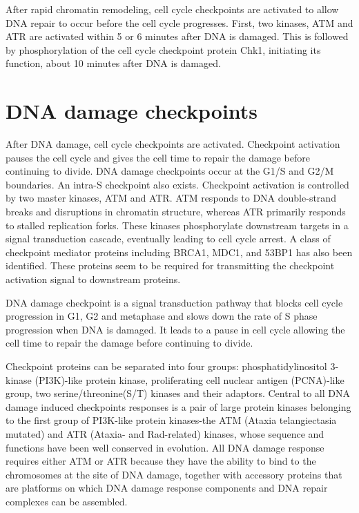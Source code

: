 After rapid chromatin remodeling, cell cycle checkpoints are activated to allow DNA repair to occur before the cell cycle progresses. First, two kinases, ATM and ATR are activated within 5 or 6 minutes after DNA is damaged. This is followed by phosphorylation of the cell cycle checkpoint protein Chk1, initiating its function, about 10 minutes after DNA is damaged.

\hypertarget{dna-damage-checkpoints}{%
\section{DNA damage checkpoints}\label{dna-damage-checkpoints}}

After DNA damage, cell cycle checkpoints are activated. Checkpoint activation pauses the cell cycle and gives the cell time to repair the damage before continuing to divide. DNA damage checkpoints occur at the G1/S and G2/M boundaries. An intra-S checkpoint also exists. Checkpoint activation is controlled by two master kinases, ATM and ATR. ATM responds to DNA double-strand breaks and disruptions in chromatin structure, whereas ATR primarily responds to stalled replication forks. These kinases phosphorylate downstream targets in a signal transduction cascade, eventually leading to cell cycle arrest. A class of checkpoint mediator proteins including BRCA1, MDC1, and 53BP1 has also been identified. These proteins seem to be required for transmitting the checkpoint activation signal to downstream proteins.

DNA damage checkpoint is a signal transduction pathway that blocks cell cycle progression in G1, G2 and metaphase and slows down the rate of S phase progression when DNA is damaged. It leads to a pause in cell cycle allowing the cell time to repair the damage before continuing to divide.

Checkpoint proteins can be separated into four groups: phosphatidylinositol 3-kinase (PI3K)-like protein kinase, proliferating cell nuclear antigen (PCNA)-like group, two serine/threonine(S/T) kinases and their adaptors. Central to all DNA damage induced checkpoints responses is a pair of large protein kinases belonging to the first group of PI3K-like protein kinases-the ATM (Ataxia telangiectasia mutated) and ATR (Ataxia- and Rad-related) kinases, whose sequence and functions have been well conserved in evolution. All DNA damage response requires either ATM or ATR because they have the ability to bind to the chromosomes at the site of DNA damage, together with accessory proteins that are platforms on which DNA damage response components and DNA repair complexes can be assembled.

